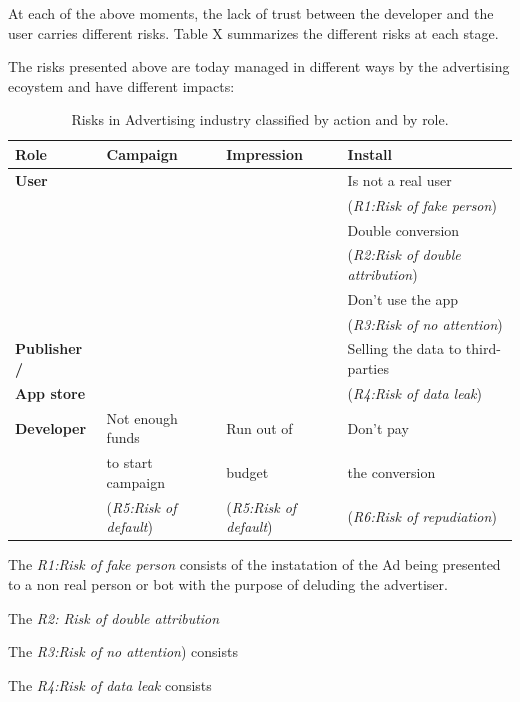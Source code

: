 
At each of the above moments, the lack of trust between the developer and the user carries different risks. Table X summarizes the different risks at each stage.


The risks presented above are today managed in different ways by the advertising ecoystem and have different impacts:

\begin{table}[h]
\centering
\begin{tabular}{|l||l|l|l|} \hline
{\bf Role} & {\bf Campaign} & {\bf Impression}  & {\bf Install} \\ \hline
{\bf User} & & & Is not a real user \\ 
 & & & ({\em R1:Risk of fake person}) \\ 
 & & & Double conversion  \\
 & & & ({\em R2:Risk of double attribution}) \\
 & & & Don't use the app  \\
 & & & ({\em R3:Risk of no attention}) \\  \hline
{\bf Publisher  /}  & & & Selling the data to third-parties \\ 
{\bf App store} & & & ({\em R4:Risk of data leak})\\ \hline
{\bf Developer} & Not enough funds & Run out of & Don't pay \\  
 & to start campaign & budget & the conversion \\  
  & ({\em R5:Risk of default}) & ({\em R5:Risk of default}) & ({\em R6:Risk of repudiation}) \\  
\hline\end{tabular}
\caption{Risks in Advertising industry classified by action and by role.}
\label{tab:risks}
\end{table}


The {\em R1:Risk of fake person} consists of the instatation of the Ad being presented to a non real person or bot with the purpose of deluding the advertiser.

\medskip

The {\em R2: Risk of double attribution} 

\medskip

The {\em R3:Risk of no attention})  consists

\medskip

The {\em R4:Risk of data leak} consists

